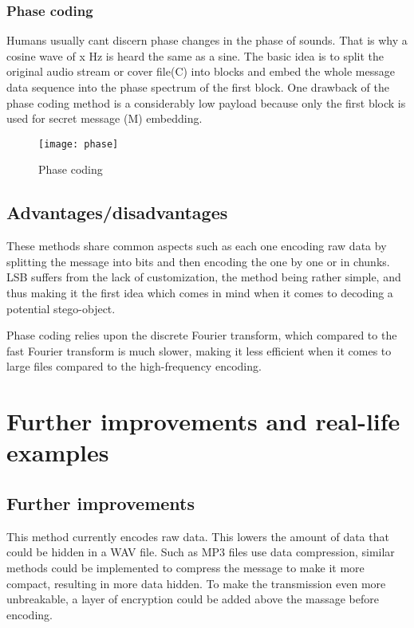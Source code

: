 \documentclass[12pt]{report}
\begin{document}
\subsection{Phase coding}
Humans usually cant discern phase changes in the phase of sounds. That is why a cosine wave of x Hz is heard the same as a sine. The basic idea is to split the original audio stream or cover file(C) into blocks and embed the whole message data sequence into the phase spectrum of the first block. One drawback of the phase coding method is a considerably low payload because only the first block is used for secret message (M) embedding.
\begin{figure}[h]
\centering
\texttt{[image: phase]}
\caption{Phase coding}
\label{fig:phase}
\end{figure}

\section{Advantages/disadvantages}
These methods share common aspects such as each one encoding raw data by splitting the message into bits and then encoding the one by one or in chunks. LSB suffers from the lack of customization, the method being rather simple, and thus making it the first idea which comes in mind when it comes to decoding a potential stego-object.

Phase coding relies upon the discrete Fourier transform, which compared to the fast Fourier transform is much slower, making it less efficient when it comes to large files compared to the high-frequency encoding.

\chapter{Further improvements and real-life examples}
\section{Further improvements}
This method currently encodes raw data. This lowers the amount of data that could be hidden in a WAV file. Such as MP3 files use data compression, similar methods could be implemented to compress the message to make it more compact, resulting in more data hidden.
To make the transmission even more unbreakable, a layer of encryption could be added above the massage before encoding.
\end{document}
